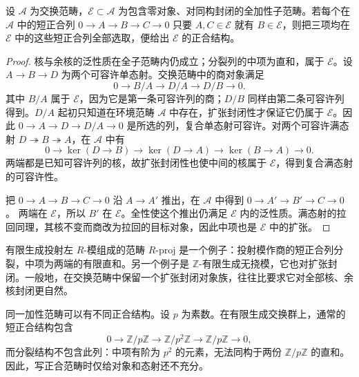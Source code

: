 \begin{proposition}\label{b4:prop:B-extension-closed}
	设 \(\mathcal A\) 为交换范畴，\(\mathcal E\subset\mathcal A\) 为包含零对象、对同构封闭的全加性子范畴。若每个在 \(\mathcal A\) 中的短正合列 \(0\rightarrow A\rightarrow B\rightarrow C\rightarrow0\) 只要 \(A,C\in\mathcal E\) 就有 \(B\in\mathcal E\)，则把三项均在 \(\mathcal E\) 中的这些短正合列全部选取，便给出 \(\mathcal E\) 的正合结构。
\end{proposition}
\begin{proof}
	核与余核的泛性质在全子范畴内仍成立；分裂列的中项为直和，属于 \(\mathcal E\)。设 \(A\rightarrow B\rightarrow D\) 为两个可容许单态射。交换范畴中的商对象满足
	\[
		0\longrightarrow B/A\longrightarrow D/A\longrightarrow D/B\longrightarrow0.
	\]
	其中 \(B/A\) 属于 \(\mathcal E\)，因为它是第一条可容许列的商；\(D/B\) 同样由第二条可容许列得到。\(D/A\) 起初只知道在环境范畴 \(\mathcal A\) 中存在，扩张封闭性才保证它仍属于 \(\mathcal E\)。因此 \(0\to A\to D\to D/A\to0\) 是所选的列，复合单态射可容许。对两个可容许满态射 \(D\twoheadrightarrow B\twoheadrightarrow A\)，在 \(\mathcal A\) 中有
	\[
		0\longrightarrow\ker(D\to B)\longrightarrow\ker(D\to A) \longrightarrow\ker(B\to A)\longrightarrow0.
	\]
	两端都是已知可容许列的核，故扩张封闭性也使中间的核属于 \(\mathcal E\)，得到复合满态射的可容许性。

	把 \(0\rightarrow A\rightarrow B\rightarrow C\rightarrow0\) 沿 \(A\rightarrow A'\) 推出，在 \(\mathcal A\) 中得到 \(0\rightarrow A'\rightarrow B'\rightarrow C\rightarrow0\)。 两端在 \(\mathcal E\)，所以 \(B'\) 在 \(\mathcal E\)。全性使这个推出仍满足 \(\mathcal E\) 内的泛性质。满态射的拉回同理，其核不变而商改为拉回的目标对象，因此中项也是 \(\mathcal E\) 中的扩张。
\end{proof}

有限生成投射左 \(R\)-模组成的范畴 \(R\text{-}\mathrm{proj}\) 是一个例子：投射模作商的短正合列分裂，中项为两端的有限直和。另一个例子是 \(\mathbb Z\)-有限生成无挠模，它也对扩张封闭。一般地，在交换范畴中保留一个扩张封闭对象族，往往比要求它对全部核、余核封闭更自然。

\ProseParagraphBreak
同一加性范畴可以有不同正合结构。设 \(p\) 为素数。在有限生成交换群上，通常的短正合结构包含
\[
	0\longrightarrow\mathbb Z/p\mathbb Z \longrightarrow\mathbb Z/p^2\mathbb Z \longrightarrow\mathbb Z/p\mathbb Z\longrightarrow0,
\]
而分裂结构不包含此列：中项有阶为 \(p^2\) 的元素，无法同构于两份 \(\mathbb Z/p\mathbb Z\) 的直和。因此，写正合范畴时仅给对象和态射还不充分。

